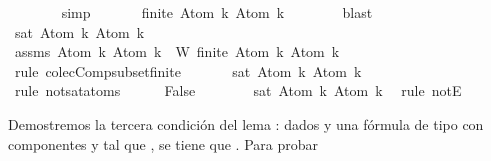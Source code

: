 \begin{isabellebody}
\ \ \ \ \ \ \isamarkupfalse%
\ simp\ \isanewline
\ \ \ \ \isamarkupfalse%
\ {\isachardoublequoteopen}finite\ {\isacharbraceleft}Atom\ k{\isacharcomma}\ \isactrlbold {\isasymnot}{\isacharparenleft}Atom\ k{\isacharparenright}{\isacharbraceright}{\isachardoublequoteclose}\isanewline
\ \ \ \ \ \ \isamarkupfalse%
\ blast\isanewline
\ \ \ \ \isamarkupfalse%
\ {\isachardoublequoteopen}sat\ {\isacharparenleft}{\isacharbraceleft}Atom\ k{\isacharcomma}\ \isactrlbold {\isasymnot}{\isacharparenleft}Atom\ k{\isacharparenright}{\isacharbraceright}{\isacharparenright}{\isachardoublequoteclose}\isanewline
\ \ \ \ \ \ \isamarkupfalse%
\ assms\ {\isacartoucheopen}{\isacharbraceleft}Atom\ k{\isacharcomma}\ \isactrlbold {\isasymnot}{\isacharparenleft}Atom\ k{\isacharparenright}{\isacharbraceright}\ {\isasymsubseteq}\ W{\isacartoucheclose}\ {\isacartoucheopen}finite\ {\isacharbraceleft}Atom\ k{\isacharcomma}\ \isactrlbold {\isasymnot}{\isacharparenleft}Atom\ k{\isacharparenright}{\isacharbraceright}{\isacartoucheclose}\ \isamarkupfalse%
\ {\isacharparenleft}rule\ colecComp{\isacharunderscore}subset{\isacharunderscore}finite{\isacharparenright}\isanewline
\ \ \ \ \isamarkupfalse%
\ {\isachardoublequoteopen}{\isasymnot}\ sat\ {\isacharparenleft}{\isacharbraceleft}Atom\ k{\isacharcomma}\ \isactrlbold {\isasymnot}{\isacharparenleft}Atom\ k{\isacharparenright}{\isacharbraceright}{\isacharparenright}{\isachardoublequoteclose}\isanewline
\ \ \ \ \ \ \isamarkupfalse%
\ {\isacharparenleft}rule\ not{\isacharunderscore}sat{\isacharunderscore}atoms{\isacharparenright}\isanewline
\ \ \ \ \isamarkupfalse%
\ {\isachardoublequoteopen}False{\isachardoublequoteclose}\isanewline
\ \ \ \ \ \ \isamarkupfalse%
\ {\isacartoucheopen}sat\ {\isacharparenleft}{\isacharbraceleft}Atom\ k{\isacharcomma}\ \isactrlbold {\isasymnot}{\isacharparenleft}Atom\ k{\isacharparenright}{\isacharbraceright}{\isacharparenright}{\isacartoucheclose}\ \isamarkupfalse%
\ {\isacharparenleft}rule\ notE{\isacharparenright}\isanewline
\ \ \isamarkupfalse%
\isanewline
{}\isamarkupfalse%
%
\endisatagproof
{\isafoldproof}%
%
\isadelimproof
%
\endisadelimproof
%
\begin{isamarkuptext}%
Demostremos la tercera condición del lema : dados  y  una fórmula de 
  tipo \isa{{\isasymalpha}} con componentes  y  tal que , se tiene que . Para probar 

\end{isamarkuptext}
\end{isabellebody}
